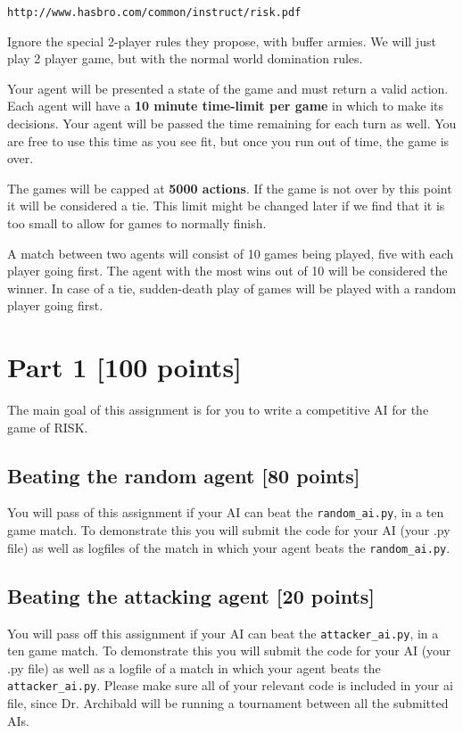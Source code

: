 \documentclass[10pt,a4paper]{article}
\begin{document}
\texttt{http://www.hasbro.com/common/instruct/risk.pdf}

Ignore the special 2-player rules they propose, with buffer armies.  We will just play 2 player game, but with the normal world domination rules.  

Your agent will be presented a state of the game and must return a valid action.  Each agent will have a \textbf{10 minute time-limit per game} in which to make its decisions.  Your agent will be passed the time remaining for each turn as well.  You are free to use this time as you see fit, but once you run out of time, the game is over.  

The games will be capped at \textbf{5000 actions}.  If the game is not over by this point it will be considered a tie.  This limit might be changed later if we find that it is too small to allow for games to normally finish. 

A match between two agents will consist of 10 games being played, five with each player going first.  The agent with the most wins out of 10 will be considered the winner.  In case of a tie, sudden-death play of games will be played with a random player going first. 

\section*{Part 1 [100 points]} 

The main goal of this assignment is for you to write a competitive AI for the game of RISK.  

\subsection*{Beating the random agent [80 points]}
You will pass of this assignment if your AI can beat the \texttt{random\_ai.py}, in a ten game match.  To demonstrate this you will submit the code for your AI (your .py file) as well as logfiles of the match in which your agent beats the \texttt{random\_ai.py}.   

\subsection*{Beating the attacking agent [20 points]}
You will pass off this assignment if your AI can beat the \texttt{attacker\_ai.py}, in a ten game match.  To demonstrate this you will submit the code for your AI (your .py file) as well as a logfile of a match in which your agent beats the \texttt{attacker\_ai.py}.   Please make sure all of your relevant code is included in your ai file, since Dr. Archibald will be running a tournament between all the submitted AIs.  
\end{document}

